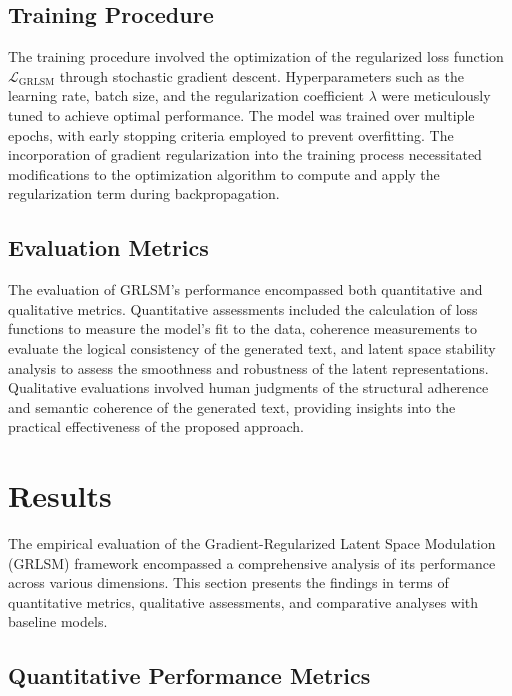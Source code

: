 \documentclass{article}
\begin{document}
\subsection{Training Procedure}

The training procedure involved the optimization of the regularized loss function \( \mathcal{L}_{\text{GRLSM}} \) through stochastic gradient descent. Hyperparameters such as the learning rate, batch size, and the regularization coefficient \( \lambda \) were meticulously tuned to achieve optimal performance. The model was trained over multiple epochs, with early stopping criteria employed to prevent overfitting. The incorporation of gradient regularization into the training process necessitated modifications to the optimization algorithm to compute and apply the regularization term during backpropagation.

\subsection{Evaluation Metrics}

The evaluation of GRLSM's performance encompassed both quantitative and qualitative metrics. Quantitative assessments included the calculation of loss functions to measure the model's fit to the data, coherence measurements to evaluate the logical consistency of the generated text, and latent space stability analysis to assess the smoothness and robustness of the latent representations. Qualitative evaluations involved human judgments of the structural adherence and semantic coherence of the generated text, providing insights into the practical effectiveness of the proposed approach.




\section{Results}

The empirical evaluation of the Gradient-Regularized Latent Space Modulation (GRLSM) framework encompassed a comprehensive analysis of its performance across various dimensions. This section presents the findings in terms of quantitative metrics, qualitative assessments, and comparative analyses with baseline models.

\subsection{Quantitative Performance Metrics}
\end{document}

